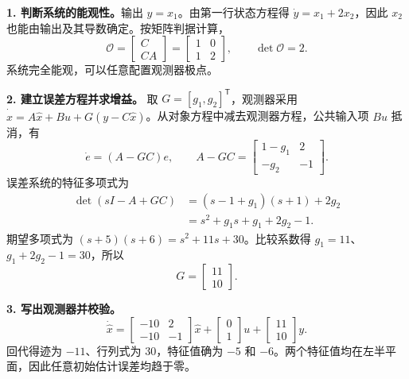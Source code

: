 

\sol\textbf{1. 判断系统的能观性。}输出 $y=x_1$。由第一行状态方程得 $\dot y=x_1+2x_2$，因此 $x_2$ 也能由输出及其导数确定。按矩阵判据计算，
\[
    \mathcal O=\begin{bmatrix}C\\CA\end{bmatrix}
    =\begin{bmatrix}1&0\\1&2\end{bmatrix},
    \qquad \det\mathcal O=2 .
\]
系统完全能观，可以任意配置观测器极点。

\textbf{2. 建立误差方程并求增益。}
取 $G=[g_1,g_2]^{\mathsf T}$，观测器采用 $\dot{\hat x}=A\hat x+Bu+G(y-C\hat x)$。从对象方程中减去观测器方程，公共输入项 $Bu$ 抵消，有
\[
    \dot e=(A-GC)e,\qquad
    A-GC=\begin{bmatrix}1-g_1&2\\-g_2&-1\end{bmatrix}.
\]
误差系统的特征多项式为
\[
\begin{aligned}
    \det(sI-A+GC)&=(s-1+g_1)(s+1)+2g_2\\
                 &=s^2+g_1 s+g_1+2g_2-1.
\end{aligned}
\]
期望多项式为 $(s+5)(s+6)=s^2+11s+30$。比较系数得 $g_1=11$、$g_1+2g_2-1=30$，所以
\[
    \boxed{G=\begin{bmatrix}11\\10\end{bmatrix}} .
\]

\textbf{3. 写出观测器并校验。}
\[
    \dot{\hat x}=\begin{bmatrix}-10&2\\-10&-1\end{bmatrix}\hat x
       +\begin{bmatrix}0\\1\end{bmatrix}u
       +\begin{bmatrix}11\\10\end{bmatrix}y .
\]
回代得迹为 $-11$、行列式为 $30$，特征值确为 $-5$ 和 $-6$。两个特征值均在左半平面，因此任意初始估计误差均趋于零。


